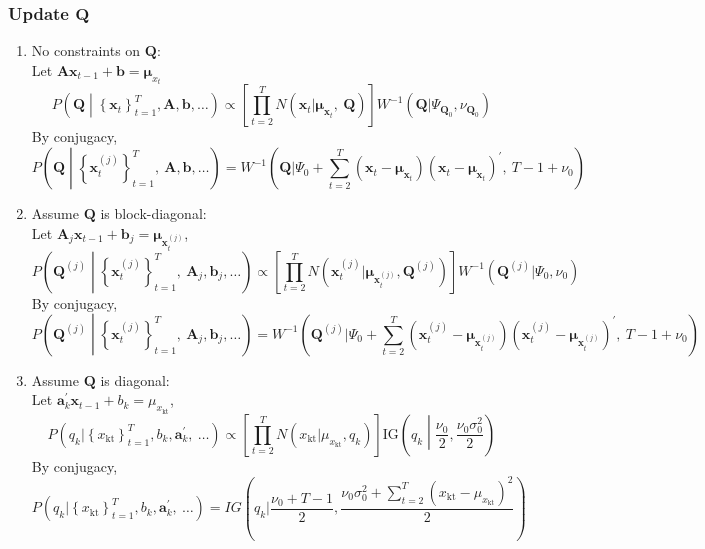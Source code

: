 \documentclass[]{article}
\begin{document}
\subsubsection{Update \(\mathbf{Q}\)}
\begin{enumerate}
	\def\labelenumi{(\arabic{enumi})}
	\item
	No constraints on \(\mathbf{Q}\):\\
	Let \(\mathbf{A}\mathbf{x}_{t - 1} + \mathbf{b} = \bm{\mu}_{x_{t}}\)
	\[P\left( \mathbf{Q} \middle| \left\{ \mathbf{x}_{t} \right\}_{t = 1}^{T},\mathbf{A},\mathbf{b},\ldots \right) \propto \left\lbrack \prod_{t = 2}^{T}{N\left( \mathbf{x}_{t}|\bm{\mu}_{\mathbf{x}_{t}},\ \mathbf{Q} \right)} \right\rbrack W^{- 1}(\mathbf{Q}|\Psi_{\mathbf{Q}_{0}},\nu_{\mathbf{Q}_{0}})\]
	By conjugacy,
	\[P\left( \mathbf{Q} \middle| \left\{ \mathbf{x}_{t}^{(j)} \right\}_{t = 1}^{T},\ \mathbf{A},\mathbf{b},\ldots \right) = W^{- 1}\left( \mathbf{Q}|\Psi_{0} + \sum_{t = 2}^{T}{\left( \mathbf{x}_{t} - \bm{\mu}_{\mathbf{x}_{t}} \right)\left( \mathbf{x}_{t} - \bm{\mu}_{\mathbf{x}_{t}} \right)^{'}},\ T - 1 + \nu_{0} \right)\]
	
	\item
	Assume \(\mathbf{Q}\) is block-diagonal:\\
	Let \(\mathbf{A}_{j}\mathbf{x}_{t - 1} + \mathbf{b}_{j}\mathbf{=}\bm{\mu}_{\mathbf{x}_{t}^{(j)}}\),
	\[P\left( \mathbf{Q}^{(j)} \middle| \left\{ \mathbf{x}_{t}^{(j)} \right\}_{t = 1}^{T},\ \mathbf{A}_{j},\mathbf{b}_{j},\ldots \right) \propto \left\lbrack \prod_{t = 2}^{T}{N\left( \mathbf{x}_{t}^{(j)}|\bm{\mu}_{\mathbf{x}_{t}^{(j)}},\mathbf{Q}^{(j)} \right)} \right\rbrack W^{- 1}\left( \mathbf{Q}^{(j)}|\Psi_{0},\nu_{0} \right)\]
	By conjugacy,
	\[P\left( \mathbf{Q}^{(j)} \middle| \left\{ \mathbf{x}_{t}^{(j)} \right\}_{t = 1}^{T},\ \mathbf{A}_{j},\mathbf{b}_{j},\ldots \right) = W^{- 1}\left( \mathbf{Q}^{(j)}|\Psi_{0} + \sum_{t = 2}^{T}{\left( \mathbf{x}_{t}^{(j)} - \bm{\mu}_{\mathbf{x}_{t}^{(j)}} \right)\left( \mathbf{x}_{t}^{(j)} - \bm{\mu}_{\mathbf{x}_{t}^{(j)}} \right)^{'}},\ T - 1 + \nu_{0} \right)\]
	
	\item
	Assume \(\mathbf{Q}\) is diagonal:\\
	Let \(\mathbf{a}_{k}^{'}\mathbf{x}_{t - 1} + b_{k} = \mu_{x_{\text{kt}}}\),
	\[P\left( q_{k}|\left\{ x_{\text{kt}} \right\}_{t = 1}^{T},b_{k},\mathbf{a}_{k}^{'},\ \ldots \right) \propto \left\lbrack \prod_{t = 2}^{T}{N\left( x_{\text{kt}}|\mu_{x_{\text{kt}}},q_{k} \right)} \right\rbrack\text{IG}\left( q_{k} \middle| \frac{\nu_{0}}{2},\frac{\nu_{0}\sigma_{0}^{2}}{2} \right)\]
	By conjugacy,
	\[P\left( q_{k}|\left\{ x_{\text{kt}} \right\}_{t = 1}^{T},b_{k},\mathbf{a}_{k}^{'},\ \ldots \right) = IG\left( q_{k}|\frac{\nu_{0} + T - 1}{2},\frac{\nu_{0}\sigma_{0}^{2} + \sum_{t = 2}^{T}\left( x_{\text{kt}} - \mu_{x_{\text{kt}}} \right)^{2}}{2} \right)\]
\end{enumerate}
\end{document}
